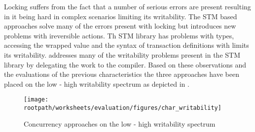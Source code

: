 Locking suffers from the fact that a number of serious errors are present resulting in it being hard in complex scenarios limiting its writability. The \ac{STM} based approaches solve many of the errors present with locking but introduces new problems with ireversible actions. Th \ac{STM} library has problems with types, accessing the wrapped value and the syntax of transaction definitions with limits its writability. \stmname addresses many of the writability problems present in the \ac{STM} library by delegating the work to the compiler. Based on these observations and the evaluations of the previous characteristics the three approaches have been placed on the low - high writability spectrum as depicted in .

\begin{figure}[htbp]
\centering
 \texttt{[image: \\rootpath/worksheets/evaluation/figures/char\_writability]} 
 \caption{Concurrency approaches on the low - high writability spectrum}
\label{fig:char_tl_writability}
\end{figure}

\worksheetend
